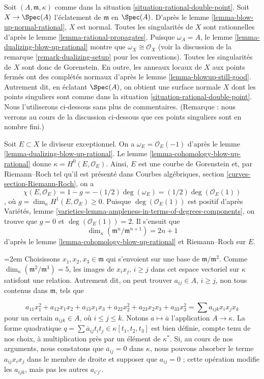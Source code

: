 \noindent Soit $(A, \mathfrak m, \kappa)$ comme dans la situation \ref{situation-rational-double-point}. Soit $X \to \Spec(A)$ l'éclatement de $\mathfrak m$ en $\Spec(A)$. D'après le lemme \ref{lemma-blow-up-normal-rational}, $X$ est normal. Toutes les singularités de $X$ sont rationnelles d'après le lemme \ref{lemma-rational-propagates}. Puisque $\omega_A = A$, le lemme \ref{lemma-dualizing-blow-up-rational} montre que $\omega_X \cong \mathcal{O}_X$ (voir la discussion de la remarque \ref{remark-dualizing-setup} pour les conventions). Toutes les singularités de $X$ sont donc de Gorenstein. En outre, les anneaux locaux de $X$ aux points fermés ont des complétés normaux d'après le lemme \ref{lemma-blowup-still-good}. Autrement dit, en éclatant $\Spec(A)$, on obtient une surface normale $X$ dont les points singuliers sont comme dans la situation \ref{situation-rational-double-point}. Nous l'utiliserons ci-dessous sans plus de commentaires. (Remarque : nous verrons au cours de la discussion ci-dessous que ces points singuliers sont en nombre fini.)

\medskip\noindent Soit $E \subset X$ le diviseur exceptionnel. On a $\omega_E = \mathcal{O}_E(-1)$ d'après le lemme \ref{lemma-dualizing-blow-up-rational}. Le lemme \ref{lemma-cohomology-blow-up-rational} donne $\kappa = H^0(E, \mathcal{O}_E)$. Ainsi, $E$ est une courbe de Gorenstein et, par Riemann--Roch tel qu'il est présenté dans Courbes algébriques, section \ref{curves-section-Riemann-Roch}, on a $$
\chi(E, \mathcal{O}_E) = 1 - g = -(1/2) \deg(\omega_E) =
(1/2)\deg(\mathcal{O}_E(1))
$$, où $g = \dim_\kappa H^1(E, \mathcal{O}_E) \geq 0$. Puisque $\deg(\mathcal{O}_E(1))$ est positif d'après Variétés, lemme \ref{varieties-lemma-ampleness-in-terms-of-degrees-components}, on trouve que $g = 0$ et $\deg(\mathcal{O}_E(1)) = 2$. Il s'ensuit que $$
\dim_\kappa (\mathfrak m^n/\mathfrak m^{n + 1}) = 2n + 1
$$ d'après le lemme \ref{lemma-cohomology-blow-up-rational} et Riemann--Roch sur $E$.

\medskip\noindent \begingroup\emergencystretch=2em
Choisissons $x_1, x_2, x_3 \in \mathfrak m$ qui s'envoient sur une base de $\mathfrak m/\mathfrak m^2$. Comme $\dim_\kappa(\mathfrak m^2/\mathfrak m^3) = 5$, les images de $x_i x_j$, $i \geq j$ dans cet espace vectoriel sur $\kappa$ satisfont une relation. Autrement dit, on peut trouver $a_{ij} \in A$, $i \geq j$, non tous contenus dans $\mathfrak m$, tels que\par\endgroup
$$
a_{11} x_1^2 + a_{12} x_1x_2 + a_{13}x_1x_3 + a_{22} x_2^2 +
a_{23} x_2x_3 + a_{33} x_3^2 =
\sum a_{ijk} x_ix_jx_k
$$ pour un certain $a_{ijk} \in A$, où $i \leq j \leq k$. Notons $a \mapsto \overline{a}$ l'application $A \to \kappa$. La forme quadratique $q = \sum \overline{a}_{ij} t_i t_j \in \kappa[t_1, t_2, t_3]$ est bien définie, compte tenu de nos choix, à multiplication près par un élément de $\kappa^*$. Si, au cours de nos arguments, nous constatons que $\overline{a}_{ij} = 0$ dans $\kappa$, nous pouvons absorber le terme $a_{ij} x_i x_j$ dans le membre de droite et supposer que $a_{ij} = 0$ ; cette opération modifie les $a_{ijk}$, mais pas les autres $a_{i'j'}$.

